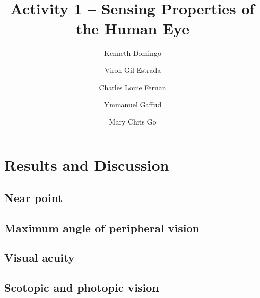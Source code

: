 \documentclass[12pt,a4paper]{article}
\begin{document}
\title{\TitleFont Activity 1 -- Sensing Properties of the Human Eye}
\author[ ]{Kenneth Domingo\authorsep}
\author[ ]{Viron Gil Estrada\authorsep}
\author[ ]{Charles Louie Fernan\authorsep}
\author[ ]{Ymmanuel Gaffud\authorsep}
\author[ ]{Mary Chris Go\lastauthorsep}

\maketitle
\thispagestyle{titlestyle}

\section*{Results and Discussion}

\setcounter{section}{1}
\subsection{Near point}

\subsection{Maximum angle of peripheral vision}

\subsection{Visual acuity}

\subsection{Scotopic and photopic vision}
\end{document}

